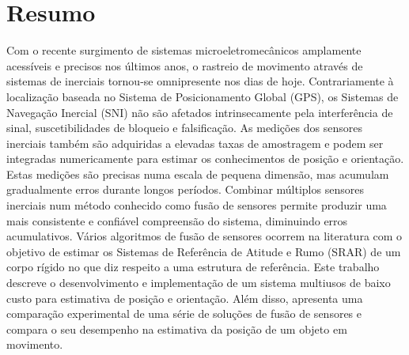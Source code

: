 \chapter*{Resumo}
\justify
Com o recente surgimento de sistemas microeletromecânicos amplamente acessíveis e precisos nos últimos anos, o rastreio de movimento através de sistemas de inerciais tornou-se omnipresente nos dias de hoje. Contrariamente à localização baseada no Sistema de Posicionamento Global (GPS), os Sistemas de Navegação Inercial (SNI) não são afetados intrinsecamente pela interferência de sinal, suscetibilidades de bloqueio e falsificação. As medições dos sensores inerciais também são adquiridas a elevadas taxas de amostragem e podem ser integradas numericamente para estimar os conhecimentos de posição e orientação. Estas medições são precisas numa escala de pequena dimensão, mas acumulam gradualmente erros durante longos períodos. Combinar múltiplos sensores inerciais num método conhecido como fusão de sensores permite produzir uma mais consistente e confiável compreensão do sistema, diminuindo erros acumulativos. Vários algoritmos de fusão de sensores ocorrem na literatura com o objetivo de estimar os Sistemas de Referência de Atitude e Rumo (SRAR) de um corpo rígido no que diz respeito a uma estrutura de referência. Este trabalho descreve o desenvolvimento e implementação de um sistema multiusos de baixo custo para estimativa de posição e orientação. Além disso, apresenta uma comparação experimental de uma série de soluções de fusão de sensores e compara o seu desempenho na estimativa da posição de um objeto em movimento.

